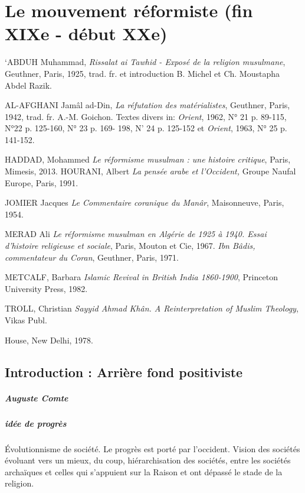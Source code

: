 \chapter{Le mouvement réformiste (fin XIXe - début XXe)}
 
 
  
  `ABDUH Muhammad, \emph{Rissalat ai Tawhid - Exposé de la religion
  musulmane}, Geuthner, Paris, 1925, trad. fr. et introduction B. Michel
  et Ch. Moustapha Abdel Razik.
  
 
  
  AL-AFGHANI Jamâl ad-Din, \emph{La réfutation des matérialistes},
  Geuthner, Paris, 1942, trad. fr. A.-M. Goichon. Textes divers in:
  \emph{Orient}, 1962, N° 21 p. 89-115, N°22 p. 125-160, N° 23 p. 169-
  198, N' 24 p. 125-152 et \emph{Orient}, 1963, N° 25 p. 141-152.
 


HADDAD, Mohammed \emph{Le réformisme musulman : une histoire critique},
Paris, Mimesis, 2013. HOURANI, Albert \emph{La pensée arabe et
l'Occident,} Groupe Naufal Europe, Paris, 1991.

JOMIER Jacques \emph{Le Commentaire coranique du Manâr}, Maisonneuve,
Paris, 1954.

MERAD Ali \emph{Le réformisme musulman en Algérie de 1925 à 1940. Essai
d'histoire religieuse et sociale}, Paris, Mouton et Cie, 1967.
 \emph{Ibn Bâdis,
commentateur du Coran}, Geuthner, Paris, 1971.

METCALF, Barbara \emph{Islamic Revival in British India 1860-1900},
Princeton University Press, 1982.

TROLL, Christian \emph{Sayyid Ahmad Khân. A Reinterpretation of Muslim
Theology}, Vikas Publ.

House, New Delhi, 1978.



 \section{Introduction : Arrière fond positiviste}
 
 \paragraph{Auguste Comte}
 
 \paragraph{idée de progrès} Évolutionnisme de société. Le progrès est porté par l'occident. Vision des sociétés évoluant vers un mieux, du coup, hiérarchisation des sociétés, entre les sociétés archaïques et celles qui s'appuient sur la Raison et ont dépassé le stade de la religion.
 
